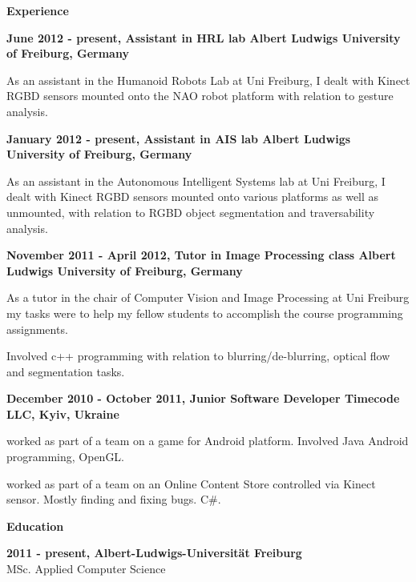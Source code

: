 \documentclass[a4paper,12pt,final]{memoir}
\newcommand{\Sep}{\vspace{1.5em}}
\newcommand{\SmallSep}{\vspace{0.5em}}
\newcommand{\CVSection}[1]
	{\Large\textbf{#1}\par
	\SmallSep\normalsize\normalfont}
\newcommand{\CVItem}[1]
	{\textbf{\color{MidnightBlue} #1}}
\begin{document}
\CVSection{Experience}
\CVItem{June 2012 - present, Assistant in HRL lab
\newline Albert Ludwigs University of Freiburg, Germany}
\begin{compactitem}[\color{RoyalBlue}$\circ$]
	\item As an assistant in the Humanoid Robots Lab at Uni Freiburg, I dealt with Kinect RGBD sensors mounted onto the NAO robot platform with relation to gesture analysis. 
\end{compactitem}
\SmallSep

\CVItem{January 2012 - present, Assistant in AIS lab
\newline Albert Ludwigs University of Freiburg, Germany}
\begin{compactitem}[\color{RoyalBlue}$\circ$]
\item As an assistant in the Autonomous Intelligent Systems lab at Uni Freiburg, I dealt with Kinect RGBD sensors mounted onto various platforms as well as unmounted, with relation to RGBD object segmentation and traversability analysis. 
\end{compactitem}
\SmallSep

\CVItem{November 2011 - April 2012, Tutor in Image Processing class
\newline Albert Ludwigs University of Freiburg, Germany}
\begin{compactitem}[\color{RoyalBlue}$\circ$]
\item As a tutor in the chair of Computer Vision and Image Processing at Uni Freiburg my tasks were to help my fellow students to accomplish the course programming assignments. 
\item Involved c++ programming with relation to blurring/de-blurring, optical flow and segmentation tasks.
\end{compactitem}
\SmallSep

\CVItem{December 2010 - October 2011, Junior Software Developer
\newline Timecode LLC, Kyiv, Ukraine}
\begin{compactitem}[\color{MidnightBlue}$\circ$]
\item worked as part of a team on a game for Android platform. Involved Java Android programming, OpenGL.
\item worked as part of a team on an Online Content Store controlled via Kinect sensor. Mostly finding and fixing bugs. C\#.
\end{compactitem}
\Sep

\CVSection{Education}
\CVItem{2011 - present, Albert-Ludwigs-Universität Freiburg}\\
MSc. Applied Computer Science
\SmallSep
\end{document}
